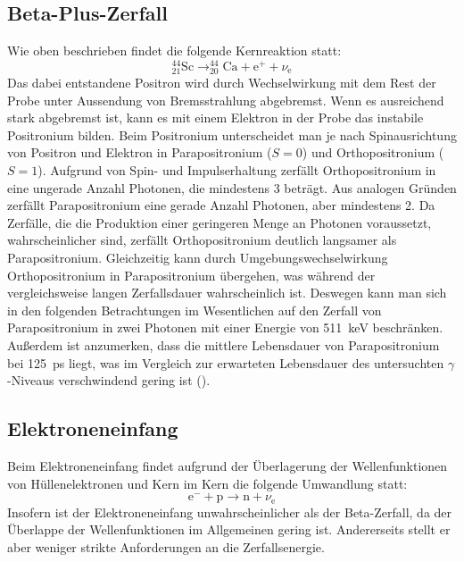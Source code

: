 \documentclass[
	a4paper,
	12pt,
	pagesize,
	ngerman
]{scrartcl}
\begin{document}
	\subsection{Beta-Plus-Zerfall}
	Wie oben beschrieben findet die folgende Kernreaktion statt:
	\begin{equation}
		\label{eq_beta-plus}
		 _{21}^{44}\text{Sc} \rightarrow _{20}^{44}\text{Ca} + \text{e}^+ + \nu_{\text{e}}
	\end{equation}
	Das dabei entstandene Positron wird durch Wechselwirkung mit dem Rest der Probe unter Aussendung von Bremsstrahlung abgebremst.
	Wenn es ausreichend stark abgebremst ist, kann es mit einem Elektron in der Probe das instabile Positronium bilden.
	Beim Positronium unterscheidet man je nach Spinausrichtung von Positron und Elektron in Parapositronium ($S=0$) und Orthopositronium ($S=1$).
	Aufgrund von Spin- und Impulserhaltung zerfällt Orthopositronium in eine ungerade Anzahl Photonen, die mindestens \num{3} beträgt.
	Aus analogen Gründen zerfällt Parapositronium eine gerade Anzahl Photonen, aber mindestens \num{2}.
	Da Zerfälle, die die Produktion einer geringeren Menge an Photonen voraussetzt, wahrscheinlicher sind, zerfällt Orthopositronium deutlich langsamer als Parapositronium.
	Gleichzeitig kann durch Umgebungswechselwirkung Orthopositronium in Parapositronium übergehen, was während der vergleichsweise langen Zerfallsdauer wahrscheinlich ist.
	Deswegen kann man sich in den folgenden Betrachtungen im Wesentlichen auf den Zerfall von Parapositronium in zwei Photonen mit einer Energie von \SI{511}{keV} beschränken.
	Außerdem ist anzumerken, dass die mittlere Lebensdauer von Parapositronium bei \SI{125}{ps} liegt, was im Vergleich zur erwarteten Lebensdauer des untersuchten $\gamma$-Niveaus verschwindend gering ist (\cite{Anleitung}).

	\subsection{Elektroneneinfang}
	Beim Elektroneneinfang findet aufgrund der Überlagerung der Wellenfunktionen von Hüllenelektronen und Kern im Kern die folgende Umwandlung statt:
	\begin{equation}
		\label{eq_elec_cap}
		\text{e}^- + \text{p} \rightarrow \text{n} + \nu_{\text{e}}
	\end{equation}
	Insofern ist der Elektroneneinfang unwahrscheinlicher als der Beta-Zerfall, da der Überlappe der Wellenfunktionen im Allgemeinen gering ist.
	Andererseits stellt er aber weniger strikte Anforderungen an die Zerfallsenergie.
\end{document}
